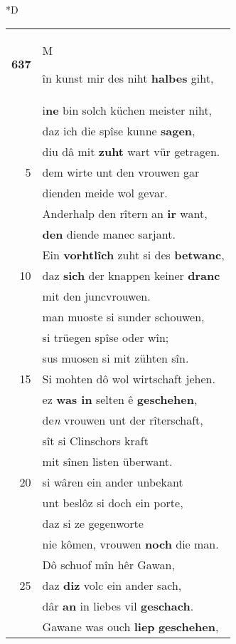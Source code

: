 \documentclass[8pt,a4paper,notitlepage]{article}
\begin{document}
\begin{table}[ht]
\begin{minipage}[t]{0.5\linewidth}
\small
\begin{center}*D
\end{center}
\begin{tabular}{rl}
\textbf{637} & \begin{large}M\end{large}în kunst mir des niht \textbf{halbes} giht,\\ 
 & i\textbf{ne} bin solch küchen meister niht,\\ 
 & daz ich die spîse kunne \textbf{sagen},\\ 
 & diu dâ mit \textbf{zuht} wart vür getragen.\\ 
5 & dem wirte unt den vrouwen gar\\ 
 & dienden meide wol gevar.\\ 
 & Anderhalp den rîtern an \textbf{ir} want,\\ 
 & \textbf{den} diende manec sarjant.\\ 
 & Ein \textbf{vorhtlîch} zuht si des \textbf{betwanc},\\ 
10 & daz \textbf{sich} der knappen keiner \textbf{dranc}\\ 
 & mit den juncvrouwen.\\ 
 & man muoste si sunder schouwen,\\ 
 & si trüegen spîse oder wîn;\\ 
 & sus muosen si mit zühten sîn.\\ 
15 & Si mohten dô wol wirtschaft jehen.\\ 
 & ez \textbf{was in} selten ê \textbf{geschehen},\\ 
 & de\textit{n} vrouwen unt der rîterschaft,\\ 
 & sît si Clinschors kraft\\ 
 & mit sînen listen überwant.\\ 
20 & si wâren ein ander unbekant\\ 
 & unt beslôz si doch ein porte,\\ 
 & daz si ze gegenworte\\ 
 & nie kômen, vrouwen \textbf{noch} die man.\\ 
 & Dô schuof mîn hêr Gawan,\\ 
25 & daz \textbf{diz} volc ein ander sach,\\ 
 & dâr \textbf{an} in liebes vil \textbf{geschach}.\\ 
 & Gawane was ouch \textbf{liep} \textbf{geschehen},\\ 

\end{tabular}
\end{minipage}
\end{table}
\end{document}
